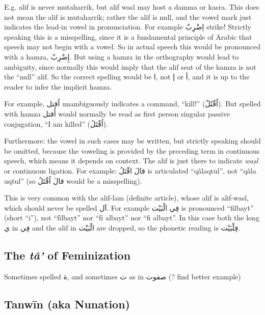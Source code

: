 \documentclass[11pt]{article}
\begin{document}
E.g. alif is never mutaharrik, but alif wasl may host a damma or
kasra. This does not mean the alif is mutaharrik; rather the alif is
null, and the vowel mark just indicates the lead-in vowel in
pronunciation. For example \textarabic{اِضْرِبْ} strike! Strictly speaking
this is a misspelling, since it is a fundamental principle of Arabic
that speech may not begin with a vowel. So in actual speech this would
be pronounced with a hamza, \textarabic{إِضْرِبْ}. But using a hamza in
the orthography would lead to ambiguity, since normally this would
imply that the alif seat of the hamza is not the “null” alif. So the
correct spelling would be \textarabic{ا}, not \textarabic{إ} or
\textarabic{أ}, and it is up to the reader to infer the implicit
hamza.

For example, \textarabic{اُقتل} unambiguously indicates a command,
“kill!” (\textarabic{اُقْتُلْ}). But spelled with hamza \textarabic{أُقتل}
would normally be read as first person singular passive conjugation,
“I am killed” (\textarabic{اُقْتَلُ}).

Furthermore: the vowel in such cases may be written, but strictly
speaking should be omitted, because the voweling is provided by the
preceding term in continuous speech, which means it depends on
context. The alif is just there to indicate \textit{waṣl} or
continuous ligation. For example: \textarabic{قالَ اقْتَلُ} is articulated
“qâlaqtul”, not “qâla uqtul” (so \textarabic{قالَ اُقْتَلُ} would be a
misspelling).

This is very common with the alif-lam (definite article), whose alif
is alif-wasl, which should never be spelled \textarabic{اَل}. For
example \textarabic{فِي الْبَيْت} is pronounced “filbayt” (short “i”), not
“fīlbayt” nor “fī albayt” nor “fi albayt”. In this case both the long
\textarabic{ي} in \textarabic{فِي} and the alif in \textarabic{الْبَيْت}
are dropped, so the phonetic reading is \textarabic{فِلْبَيْت}.

\subsection{The \textit{tâ'} of Feminization}

Sometimes spelled \textarabic{ة}, and sometimes \textarabic{ت} as in
\textarabic{صفوت} (? find better example)

\subsection{Tanwīn (aka Nunation)}
\end{document}
